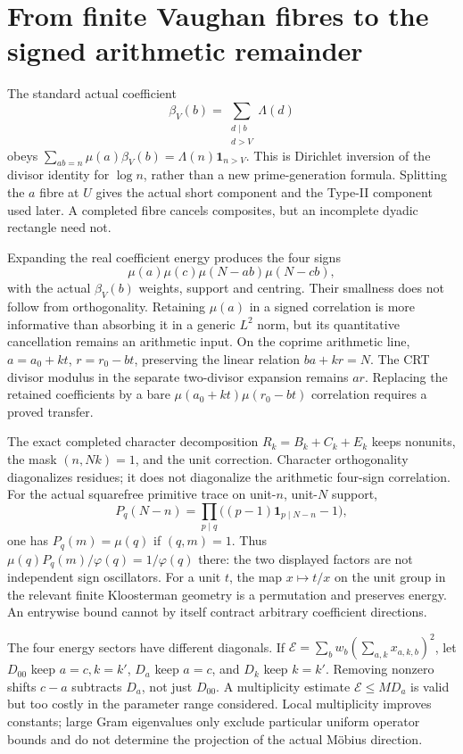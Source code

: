 \documentclass[11pt,a4paper]{article}
\theoremstyle{definition}
\theoremstyle{remark}
\newcommand{\ind}{\mathbf1}
\begin{document}
\section{From finite Vaughan fibres to the signed arithmetic remainder}\label{sec:arithmetic-road}
The standard actual coefficient
\[\beta_V(b)=\sum_{\substack{d\mid b\\d>V}}\Lambda(d)\]
obeys $\sum_{ab=n}\mu(a)\beta_V(b)=\Lambda(n)\ind_{n>V}$. This is Dirichlet inversion of the divisor identity for $\log n$, rather than a new prime-generation formula. Splitting the $a$ fibre at $U$ gives the actual short component and the Type-II component used later. A completed fibre cancels composites, but an incomplete dyadic rectangle need not.

Expanding the real coefficient energy produces the four signs
\[\mu(a)\mu(c)\mu(N-ab)\mu(N-cb),\]
with the actual $\beta_V(b)$ weights, support and centring. Their smallness does not follow from orthogonality. Retaining $\mu(a)$ in a signed correlation is more informative than absorbing it in a generic $L^2$ norm, but its quantitative cancellation remains an arithmetic input. On the coprime arithmetic line, $a=a_0+kt$, $r=r_0-bt$, preserving the linear relation $ba+kr=N$. The CRT divisor modulus in the separate two-divisor expansion remains $ar$. Replacing the retained coefficients by a bare $\mu(a_0+kt)\mu(r_0-bt)$ correlation requires a proved transfer.

The exact completed character decomposition $R_k=B_k+C_k+E_k$ keeps nonunits, the mask $(n,Nk)=1$, and the unit correction. Character orthogonality diagonalizes residues; it does not diagonalize the arithmetic four-sign correlation. For the actual squarefree primitive trace on unit-$n$, unit-$N$ support,
\[P_q(N-n)=\prod_{p\mid q}\bigl((p-1)\ind_{p\mid N-n}-1\bigr),\]
one has $P_q(m)=\mu(q)$ if $(q,m)=1$. Thus $\mu(q)P_q(m)/\varphi(q)=1/\varphi(q)$ there: the two displayed factors are not independent sign oscillators. For a unit $t$, the map $x\mapsto t/x$ on the unit group in the relevant finite Kloosterman geometry is a permutation and preserves energy. An entrywise bound cannot by itself contract arbitrary coefficient directions.

The four energy sectors have different diagonals. If $\mathcal E=\sum_b w_b(\sum_{a,k}x_{a,k,b})^2$, let $D_{00}$ keep $a=c,k=k'$, $D_a$ keep $a=c$, and $D_k$ keep $k=k'$. Removing nonzero shifts $c-a$ subtracts $D_a$, not just $D_{00}$. A multiplicity estimate $\mathcal E\le M D_a$ is valid but too costly in the parameter range considered. Local multiplicity improves constants; large Gram eigenvalues only exclude particular uniform operator bounds and do not determine the projection of the actual M\"obius direction.
\end{document}
